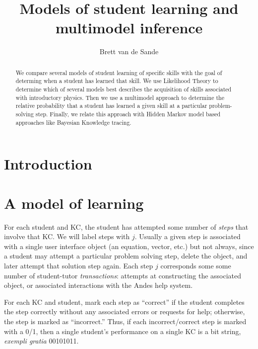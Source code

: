 \documentclass[11pt,letterpaper]{article}
\begin{document}
\title{Models of student learning and multimodel inference}
\author{Brett van de Sande}

\maketitle

\begin{abstract}
We compare several models of student learning of specific
skills with the goal of determing when a student has 
learned that skill.  We use Likelihood Theory to determine
which of several models best describes the acquisition
of skills associated with introductory physics.  Then we
use a multimodel approach to determine the relative probability
that a student has learned a given skill at a particular 
problem-solving step.  Finally, we relate this
approach with Hidden Markov model based approaches like
Bayesian Knowledge tracing.
\end{abstract}

\section{Introduction}

\section{A model of learning}

For each student and KC, the student has attempted some number of 
{\em steps} that involve that KC.   We will label
steps with $j$.  Usually a given step is associated
with a single user interface object (an equation, vector, etc.)  but
not always, since a student may attempt a particular problem solving
step, delete the object, and later attempt that solution step again.
Each step $j$ corresponds some some number of student-tutor 
{\em transactions}: attempts at constructing the associated object, 
or associated interactions with the Andes help system.  

For each KC and student, mark each step as ``correct'' if
the student completes the step correctly without any associated errors or 
requests for help; otherwise, the step is marked as ``incorrect.''
\label{steps} 
%
Thus, if each incorrect/correct step is marked with a 0/1, then
a single student's performance on a single KC is a bit string,
{\em exempli gratia} 00101011.
\end{document}

